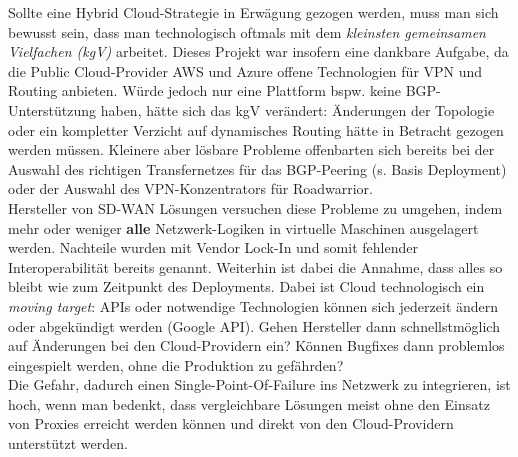 Sollte eine Hybrid Cloud-Strategie in Erwägung gezogen werden, muss man sich bewusst sein, dass man technologisch oftmals mit dem \textit{kleinsten gemeinsamen Vielfachen (kgV)} arbeitet. Dieses Projekt war insofern eine dankbare Aufgabe, da die Public Cloud-Provider AWS und Azure offene Technologien für VPN und Routing anbieten. Würde jedoch nur eine Plattform bspw. keine BGP-Unterstützung haben, hätte sich das kgV verändert: Änderungen der Topologie oder ein kompletter Verzicht auf dynamisches Routing hätte in Betracht gezogen werden müssen. Kleinere aber lösbare Probleme offenbarten sich bereits bei der Auswahl des richtigen Transfernetzes für das BGP-Peering (s. Basis Deployment) oder der Auswahl des VPN-Konzentrators für Roadwarrior.\\
Hersteller von SD-WAN Lösungen versuchen diese Probleme zu umgehen, indem mehr oder weniger \textbf{alle} Netzwerk-Logiken in virtuelle Maschinen ausgelagert werden. Nachteile wurden mit Vendor Lock-In und somit fehlender Interoperabilität bereits genannt. Weiterhin ist dabei die Annahme, dass alles so bleibt wie zum Zeitpunkt des Deployments. Dabei ist Cloud technologisch ein \textit{moving target}: APIs oder notwendige Technologien können sich jederzeit ändern oder abgekündigt werden (Google API). Gehen Hersteller dann schnellstmöglich auf Änderungen bei den Cloud-Providern ein? Können Bugfixes dann problemlos eingespielt werden, ohne die Produktion zu gefährden?\\ 
Die Gefahr, dadurch einen Single-Point-Of-Failure ins Netzwerk zu integrieren, ist hoch, wenn man bedenkt, dass vergleichbare Lösungen meist ohne den Einsatz von \glqq Proxies\grqq{} erreicht werden können und direkt von den Cloud-Providern unterstützt werden.


%



%
%

